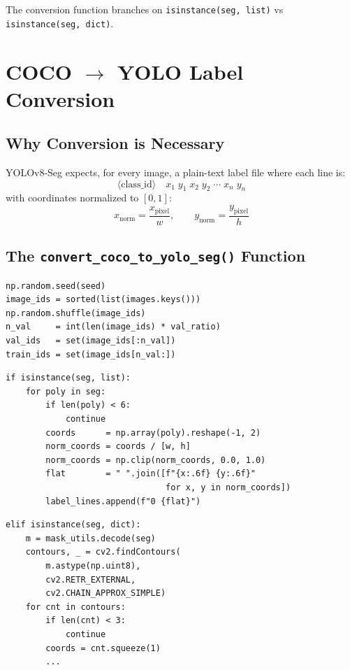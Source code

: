 \documentclass[11pt,a4paper,openany]{report}
\begin{document}
The conversion function branches on \texttt{isinstance(seg, list)} vs \texttt{isinstance(seg, dict)}.

\chapter{COCO $\to$ YOLO Label Conversion}

\section{Why Conversion is Necessary}

YOLOv8-Seg expects, for every image, a plain-text label file where each line is:
\[
  \langle\text{class\_id}\rangle\quad x_1\;y_1\;x_2\;y_2\;\cdots\;x_n\;y_n
\]
with coordinates normalized to $[0, 1]$:
\[
  x_\text{norm} = \frac{x_\text{pixel}}{w}, \qquad y_\text{norm} = \frac{y_\text{pixel}}{h}
\]

\section{The \texttt{convert\_coco\_to\_yolo\_seg()} Function}

\begin{lstlisting}[caption={Reproducible train/val split},label={lst:split}]
np.random.seed(seed)
image_ids = sorted(list(images.keys()))
np.random.shuffle(image_ids)
n_val     = int(len(image_ids) * val_ratio)
val_ids   = set(image_ids[:n_val])
train_ids = set(image_ids[n_val:])
\end{lstlisting}

\begin{lstlisting}[caption={Polygon normalization},label={lst:poly}]
if isinstance(seg, list):
    for poly in seg:
        if len(poly) < 6:
            continue
        coords      = np.array(poly).reshape(-1, 2)
        norm_coords = coords / [w, h]
        norm_coords = np.clip(norm_coords, 0.0, 1.0)
        flat        = " ".join([f"{x:.6f} {y:.6f}"
                                for x, y in norm_coords])
        label_lines.append(f"0 {flat}")
\end{lstlisting}

\begin{lstlisting}[caption={RLE decoding and contour extraction},label={lst:rle_dec}]
elif isinstance(seg, dict):
    m = mask_utils.decode(seg)
    contours, _ = cv2.findContours(
        m.astype(np.uint8),
        cv2.RETR_EXTERNAL,
        cv2.CHAIN_APPROX_SIMPLE)
    for cnt in contours:
        if len(cnt) < 3:
            continue
        coords = cnt.squeeze(1)
        ...
\end{lstlisting}
\end{document}
